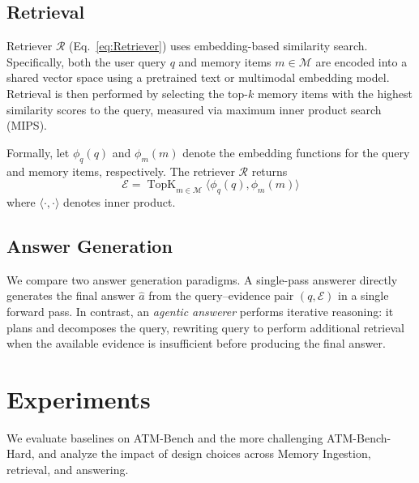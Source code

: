 \documentclass{article}
\theoremstyle{plain}
\theoremstyle{definition}
\theoremstyle{remark}
\begin{document}
\subsection{Retrieval}
Retriever $\mathcal{R}$ (Eq.~\ref{eq:Retriever}) uses embedding-based similarity search. Specifically, both the user query $q$ and memory items $m \in \mathcal{M}$ are encoded into a shared vector space using a pretrained text or multimodal embedding model. Retrieval is then performed by selecting the top-$k$ memory items with the highest similarity scores to the query, measured via maximum inner product search (MIPS).

Formally, let $\phi_q(q)$ and $\phi_m(m)$ denote the embedding functions for the query and memory items, respectively. The retriever $\mathcal{R}$ returns
\begin{equation}
\mathcal{E} = \operatorname{TopK}_{m \in \mathcal{M}} \langle \phi_q(q), \phi_m(m) \rangle
\end{equation}
where $\langle \cdot, \cdot \rangle$ denotes inner product.

\subsection{Answer Generation}
We compare two answer generation paradigms. A single-pass answerer directly generates the final answer $\hat{a}$ from the query–evidence pair $(q,\mathcal{E})$ in a single forward pass. In contrast, an \emph{agentic answerer} performs iterative reasoning: it plans and decomposes the query, rewriting query to perform additional retrieval when the available evidence is insufficient before producing the final answer.

\section{Experiments}
\label{sec:experiments}
We evaluate baselines on ATM-Bench and the more challenging ATM-Bench-Hard, and analyze the impact of design choices across Memory Ingestion, retrieval, and answering.
\end{document}
